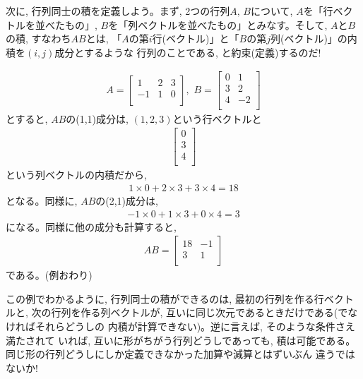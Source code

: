 次に, 行列同士の積を定義しよう。まず, 2つの行列$A,\,B$について, $A$を「行ベクトルを並べたもの」, 
$B$を「列ベクトルを並べたもの」とみなす。そして, $A$と$B$の積, すなわち$AB$とは, 
「$A$の第$i$行(ベクトル)」と「$B$の第$j$列(ベクトル)」の内積を$(i, j)$成分とするような
行列のことである, と約束(定義)するのだ!

\begin{exmpl}
\begin{eqnarray}
A=\begin{bmatrix}
1 & 2 & 3\\
-1 & 1 & 0\\
\end{bmatrix}
,\,\,
B=\begin{bmatrix}
0 & 1 \\
3 & 2 \\
4 & -2 \\
\end{bmatrix}\label{eq:matrix_exmpl01}
\end{eqnarray}
とすると, $AB$の(1,1)成分は, $(1, 2, 3)$という行ベクトルと
\begin{eqnarray*}
\begin{bmatrix}
0 \\
3 \\
4 \\
\end{bmatrix}
\end{eqnarray*}
という列ベクトルの内積だから, 
\begin{eqnarray*}1\times0+2\times3+3\times4=18\end{eqnarray*}
となる。同様に, $AB$の(2,1)成分は, 
\begin{eqnarray*}-1\times0+1\times3+0\times4=3\end{eqnarray*}
になる。同様に他の成分も計算すると, 
\begin{eqnarray}
AB=\begin{bmatrix}
18 & -1 \\
3 & 1\\
\end{bmatrix}
\end{eqnarray}
である。(例おわり)\end{exmpl}

この例でわかるように, 行列同士の積ができるのは, 
最初の行列を作る行ベクトルと, 次の行列を作る列ベクトルが, 
互いに同じ次元であるときだけである(でなければそれらどうしの
内積が計算できない)。逆に言えば, そのような条件さえ満たされて
いれば, 互いに形がちがう行列どうしであっても, 積は可能である。
同じ形の行列どうしにしか定義できなかった加算や減算とはずいぶん
違うではないか!

